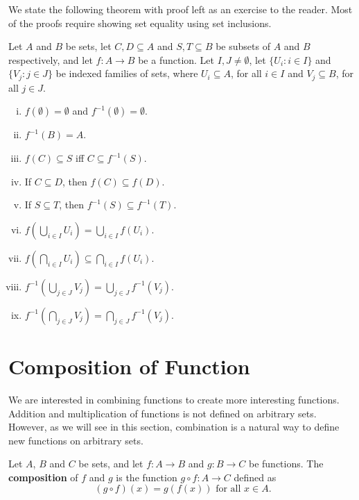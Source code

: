 \documentclass[a4paper,english,12pt]{article}
\begin{document}
We state the following theorem with proof left as an exercise to the reader. Most of the proofs require showing set equality using set inclusions.
\begin{thm} Let $A$ and $B$ be sets, let $C,D\subseteq A$ and $S,T\subseteq B$ be subsets of $A$ and $B$ respectively, and let $f:A \to B$ be a function. Let $I,J\neq\emptyset$, let $\{U_i:i \in I\}$ and $\{V_j:j \in J\}$ be indexed families of sets, where $U_i \subseteq A$, for all $i \in I$ and $V_j \subseteq B$, for all $j \in J$.
\begin{multicols}{2}
\begin{enumerate}[i)]
\item $f(\emptyset)=\emptyset$ and $f^{-1}(\emptyset)=\emptyset$.
\item $f^{-1}(B)=A$.
\item $f(C)\subseteq S$ iff $C\subseteq f^{-1}(S)$.
\item If $C\subseteq D$, then $f(C)\subseteq f(D)$.
\item If $S\subseteq T$, then $f^{-1}(S)\subseteq f^{-1}(T)$.
\item $f(\bigcup_{i\in I}U_i)=\bigcup_{i\in I}f(U_i)$.
\item $f(\bigcap_{i\in I}U_i)\subseteq \bigcap_{i\in I}f(U_i)$.
\item $f^{-1}(\bigcup_{j\in J}V_j)=\bigcup_{j\in J}f^{-1}(V_j)$.
\item $f^{-1}(\bigcap_{j\in J}V_j)=\bigcap_{j\in J}f^{-1}(V_j)$.
\end{enumerate} 
\end{multicols}
\label{img-preimg_props}
\end{thm}

\section{Composition of Function}
We are interested in combining functions to create more interesting functions. Addition and multiplication of functions is not defined on arbitrary sets. However, as we will see in this section, combination is a natural way to define new functions on arbitrary sets.
\begin{defn} Let $A$, $B$ and $C$ be sets, and let $f:A\to B$ and $g:B \to C$ be functions. The \textbf{composition} of $f$ and $g$ is the function $g\circ f:A \to C$ defined as
\begin{equation*}
(g \circ f) (x)  =g(f(x)) \text{ for all } x\in A.
\end{equation*}
\end{defn}
\end{document}
